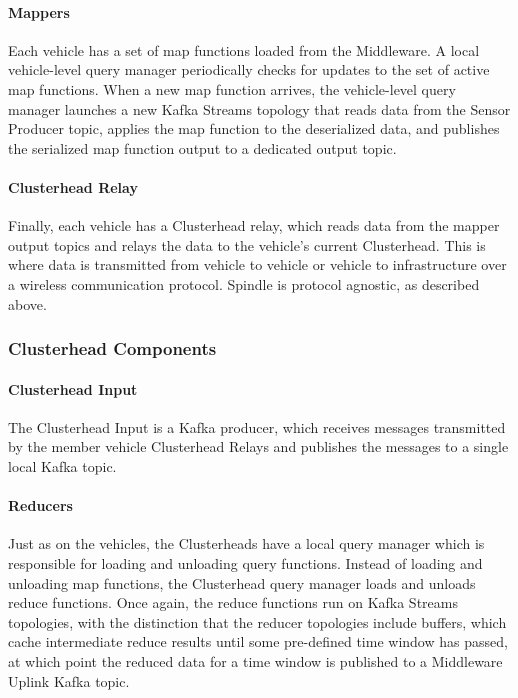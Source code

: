 \documentclass{thesis}
\begin{document}
    \paragraph{Mappers}
        Each vehicle has a set of map functions loaded from the Middleware. A local vehicle-level query manager periodically checks
        for updates to the set of active map functions. When a new map function arrives, the vehicle-level query manager
        launches a new Kafka Streams topology that reads data from the Sensor Producer topic, applies the map function to the 
        deserialized data, and publishes the serialized map function output to a dedicated output topic.
    \paragraph{Clusterhead Relay}
        Finally, each vehicle has a Clusterhead relay, which reads data from the mapper output topics and relays the data to
        the vehicle's current Clusterhead. This is where data is transmitted from vehicle to vehicle or vehicle to infrastructure
        over a wireless communication protocol. Spindle is protocol agnostic, as described above.
\subsubsection{Clusterhead Components}
    \paragraph{Clusterhead Input}
        The Clusterhead Input is a Kafka producer, which receives messages transmitted by the member vehicle
        Clusterhead Relays and publishes the messages to a single local Kafka topic.
    \paragraph{Reducers}
        Just as on the vehicles, the Clusterheads have a local query manager which is responsible for loading and unloading
        query functions. Instead of loading and unloading map functions, the Clusterhead query manager loads and unloads
        reduce functions. Once again, the reduce functions run on Kafka Streams topologies, with the distinction that the
        reducer topologies include buffers, which cache intermediate reduce results until some pre-defined time window
        has passed, at which point the reduced data for a time window is published to a Middleware Uplink Kafka topic.
\end{document}
